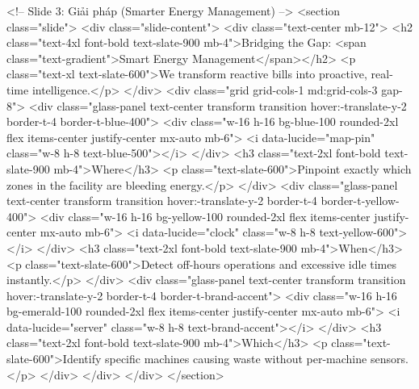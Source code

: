         <!-- Slide 3: Giải pháp (Smarter Energy Management) -->
        <section class="slide">
            <div class="slide-content">
                <div class="text-center mb-12">
                    <h2 class="text-4xl font-bold text-slate-900 mb-4">Bridging the Gap: <span class="text-gradient">Smart Energy Management</span></h2>
                    <p class="text-xl text-slate-600">We transform reactive bills into proactive, real-time intelligence.</p>
                </div>
                <div class="grid grid-cols-1 md:grid-cols-3 gap-8">
                    <div class="glass-panel text-center transform transition hover:-translate-y-2 border-t-4 border-t-blue-400">
                        <div class="w-16 h-16 bg-blue-100 rounded-2xl flex items-center justify-center mx-auto mb-6">
                            <i data-lucide="map-pin" class="w-8 h-8 text-blue-500"></i>
                        </div>
                        <h3 class="text-2xl font-bold text-slate-900 mb-4">Where</h3>
                        <p class="text-slate-600">Pinpoint exactly which zones in the facility are bleeding energy.</p>
                    </div>
                    <div class="glass-panel text-center transform transition hover:-translate-y-2 border-t-4 border-t-yellow-400">
                        <div class="w-16 h-16 bg-yellow-100 rounded-2xl flex items-center justify-center mx-auto mb-6">
                            <i data-lucide="clock" class="w-8 h-8 text-yellow-600"></i>
                        </div>
                        <h3 class="text-2xl font-bold text-slate-900 mb-4">When</h3>
                        <p class="text-slate-600">Detect off-hours operations and excessive idle times instantly.</p>
                    </div>
                    <div class="glass-panel text-center transform transition hover:-translate-y-2 border-t-4 border-t-brand-accent">
                        <div class="w-16 h-16 bg-emerald-100 rounded-2xl flex items-center justify-center mx-auto mb-6">
                            <i data-lucide="server" class="w-8 h-8 text-brand-accent"></i>
                        </div>
                        <h3 class="text-2xl font-bold text-slate-900 mb-4">Which</h3>
                        <p class="text-slate-600">Identify specific machines causing waste without per-machine sensors.</p>
                    </div>
                </div>
            </div>
        </section>

